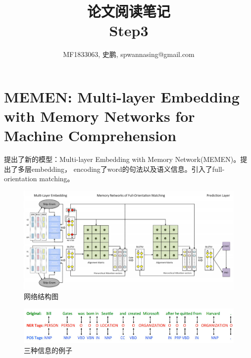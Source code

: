 \documentclass[a4paper,UTF8]{article}
\numberwithin{equation}{section}
\begin{document}
\title{论文阅读笔记\\
Step3}
\author{MF1833063, 史鹏, spwannasing@gmail.com}
\maketitle

\newpage
\section{MEMEN: Multi-layer Embedding with Memory Networks for Machine Comprehension}
提出了新的模型：Multi-layer Embedding with Memory Network(MEMEN)。提出了多层embedding，
encoding了word的句法以及语义信息。引入了full-orientation matching。
\begin{figure}[H]
	\centering
	\includegraphics[width=\textwidth]{1-1.png}
	\caption{网络结构图}
\end{figure}
\begin{figure}[H]
	\centering
	\includegraphics[width=\textwidth]{1-2.png}
	\caption{三种信息的例子}
\end{figure}
\end{document}
